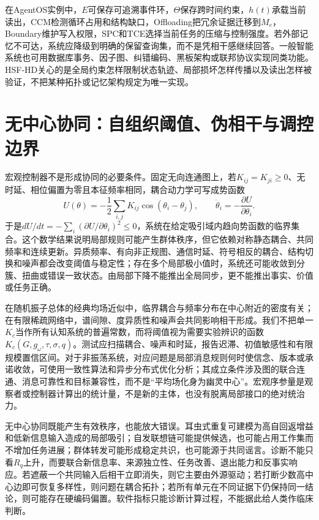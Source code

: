 在AgentOS实例中，$E$可保存可追溯事件环，$\Theta$保存跨时间约束，$h(t)$承载当前读出，CCM检测循环占用和结构缺口，Offloading把冗余证据迁移到$M_e$，Boundary维护写入权限，SPC和TCE选择当前任务的压缩与控制强度。若外部记忆不可达，系统应降级到明确的保留查询集，而不是凭相干感继续回答。一般智能系统也可用数据库事务、因子图、纠错编码、黑板架构或联邦协议实现同类功能。HSF-HD关心的是全局约束怎样限制状态轨迹、局部损坏怎样传播以及读出怎样被验证，不把某种拓扑或记忆架构规定为唯一实现。

\section{无中心协同：自组织阈值、伪相干与调控边界}
\label{sec:resonance_without_macro_layer}

宏观控制器不是形成协同的必要条件。固定无向连通图上，若$K_{ij}=K_{ji}\geq0$、无时延、相位偏置为零且本征频率相同，耦合动力学可写成势函数
\begin{equation}
U(\theta)=-\frac12\sum_{i,j}K_{ij}\cos(\theta_i-\theta_j),
\qquad \dot\theta_i=-\frac{\partial U}{\partial\theta_i}.
\label{eq:decentralized_coherence_potential}
\end{equation}
于是$dU/dt=-\sum_i(\partial U/\partial\theta_i)^2\leq0$，系统在给定吸引域内趋向势函数的临界集合。这个数学结果说明局部规则可能产生群体秩序，但它依赖对称静态耦合、共同频率和连续更新。异质频率、有向非正规图、通信时延、符号相反的耦合、结构切换和噪声都会改变阈值与稳定性；存在多个局部极小值时，系统还可能收敛到分簇、扭曲或错误一致状态。由局部下降不能推出全局同步，更不能推出事实、价值或任务正确。

在随机振子总体的经典均场近似中，临界耦合与频率分布在中心附近的密度有关；在有限稀疏网络中，谱间隙、度异质性和噪声会共同影响相干形成。我们不把单一$K_c$当作所有认知系统的普遍常数，而将阈值视为需要实验辨识的函数$K_c(G,g_\omega,\tau,\sigma,q)$。测试应扫描耦合、噪声和时延，报告迟滞、初值敏感性和有限规模置信区间。对于非振荡系统，对应问题是局部消息规则何时使信念、版本或承诺收敛，可使用一致性算法和异步分布式优化分析；其成立条件涉及图的联合连通、消息可靠性和目标兼容性，而不是“平均场化身为幽灵中心”。宏观序参量是观察者或控制器计算出的统计量，不是新的主体，也没有脱离局部接口的绝对统治力。

无中心协同既能产生有效秩序，也能放大错误。耳虫式重复可建模为高自回返增益和低新信息输入造成的局部吸引；自发联想链可能提供候选，也可能占用工作集而不增加任务进展；群体转发可能形成稳定共识，也可能源于共同谣言。诊断不能只看$R_q$上升，而要联合新信息率、来源独立性、任务改善、退出能力和反事实响应。若遮蔽一个共同输入后相干立即消失，则它主要由外源驱动；若打断少数高中心边即可恢复多样性，则问题在耦合拓扑；若所有单元在不同证据下仍保持同一结论，则可能存在硬编码偏置。软件指标只能诊断计算过程，不能据此给人类作临床判断。

